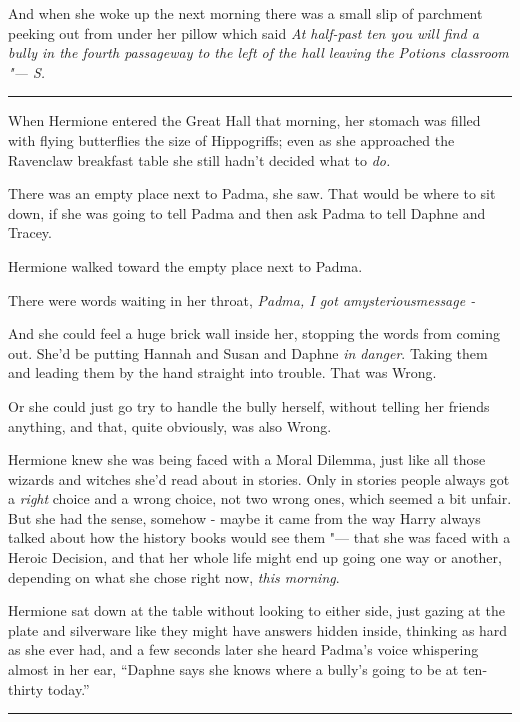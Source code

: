 And when she woke up the next morning there was a small slip of
parchment peeking out from under her pillow which said \emph{At
half-past ten you will find a bully in the fourth passageway to the left
of the hall leaving the Potions classroom "--- S.}

\begin{center}\rule{3in}{0.4pt}\end{center}

When Hermione entered the Great Hall that morning, her stomach was
filled with flying butterflies the size of Hippogriffs; even as she
approached the Ravenclaw breakfast table she still hadn't decided what
to \emph{do.}

There was an empty place next to Padma, she saw. That would be where to
sit down, if she was going to tell Padma and then ask Padma to tell
Daphne and Tracey.

Hermione walked toward the empty place next to Padma.

There were words waiting in her throat, \emph{Padma, I got
a}\emph{mysterious}\emph{message -}

And she could feel a huge brick wall inside her, stopping the words from
coming out. She'd be putting Hannah and Susan and Daphne \emph{in
danger}. Taking them and leading them by the hand straight into trouble.
That was Wrong.

Or she could just go try to handle the bully herself, without telling
her friends anything, and that, quite obviously, was also Wrong.

Hermione knew she was being faced with a Moral Dilemma, just like all
those wizards and witches she'd read about in stories. Only in stories
people always got a \emph{right} choice and a wrong choice, not two
wrong ones, which seemed a bit unfair. But she had the sense, somehow -
maybe it came from the way Harry always talked about how the history
books would see them "--- that she was faced with a Heroic Decision, and
that her whole life might end up going one way or another, depending on
what she chose right now, \emph{this morning}.

Hermione sat down at the table without looking to either side, just
gazing at the plate and silverware like they might have answers hidden
inside, thinking as hard as she ever had, and a few seconds later she
heard Padma's voice whispering almost in her ear, ``Daphne says she
knows where a bully's going to be at ten-thirty today.''

\begin{center}\rule{3in}{0.4pt}\end{center}

